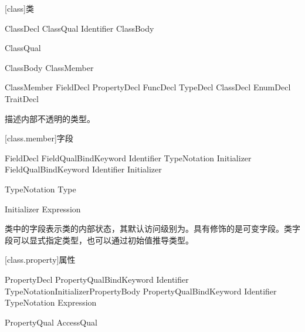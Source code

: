 
[class]{类}

\begin{bnf}{ClassDecl}
    ClassQual\bnfs {} Identifier ClassBody
\end{bnf}

\begin{bnf}{ClassQual}
\end{bnf}

\begin{bnf}{ClassBody}
    \terminal{\{} ClassMember\bnfs \terminal{\}}
\end{bnf}

\begin{bnf}{ClassMember}
    FieldDecl \br
    PropertyDecl \br
    FuncDecl \br
    TypeDecl \br
    ClassDecl \br
    EnumDecl \br
    TraitDecl
\end{bnf}

\pnum
{}描述内部不透明的类型。

[class.member]{字段}

\begin{bnf}{FieldDecl}
    FieldQual\bnfs BindKeyword Identifier TypeNotation Initializer\bnfq \terminal{;}
    FieldQual\bnfs BindKeyword Identifier Initializer \terminal{;}
\end{bnf}

\begin{bnf}{TypeNotation}
    \terminal{:} Type
\end{bnf}

\begin{bnf}{Initializer}
    \terminal{=} Expression
\end{bnf}

\pnum
类中的字段表示类的内部状态，其默认访问级别为。具有修饰的是可变字段。类字段可以显式指定类型，也可以通过初始值推导类型。

[class.property]{属性}

\begin{bnf}{PropertyDecl}
    PropertyQual\bnfs BindKeyword Identifier TypeNotation\bnfq Initializer\bnfq PropertyBody \terminal{;} \br
    PropertyQual\bnfs BindKeyword Identifier TypeNotation\bnfq \terminal{=>} Expression \terminal{;} \br
\end{bnf}

\begin{bnf}{PropertyQual}
    AccessQual
\end{bnf}

